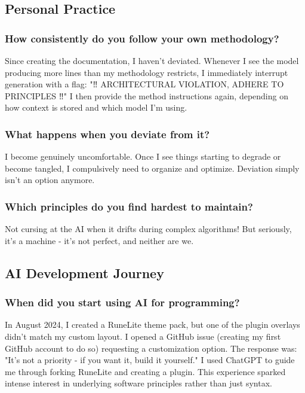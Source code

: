 \documentclass{article}
\begin{document}
\subsection{Personal Practice}

\subsubsection{How consistently do you follow your own methodology?}
Since creating the documentation, I haven't deviated. Whenever I see the model producing more lines than my methodology restricts, I immediately interrupt generation with a flag: "‼️ ARCHITECTURAL VIOLATION, ADHERE TO PRINCIPLES ‼️" I then provide the method instructions again, depending on how context is stored and which model I'm using.

\subsubsection{What happens when you deviate from it?}
I become genuinely uncomfortable. Once I see things starting to degrade or become tangled, I compulsively need to organize and optimize. Deviation simply isn't an option anymore.

\subsubsection{Which principles do you find hardest to maintain?}
Not cursing at the AI when it drifts during complex algorithms! But seriously, it's a machine - it's not perfect, and neither are we.

\subsection{AI Development Journey}

\subsubsection{When did you start using AI for programming?}
In August 2024, I created a RuneLite theme pack, but one of the plugin overlays didn't match my custom layout. I opened a GitHub issue (creating my first GitHub account to do so) requesting a customization option. The response was: "It's not a priority - if you want it, build it yourself." I used ChatGPT to guide me through forking RuneLite and creating a plugin. This experience sparked intense interest in underlying software principles rather than just syntax.
\end{document}
